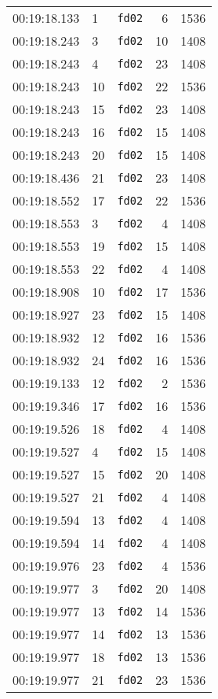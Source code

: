 \documentclass{article}
\begin{document}
\begin{longtable}{lllrr}
00:19:18.133 & 1 & \texttt{fd02} & 6 & 1536 \\
00:19:18.243 & 3 & \texttt{fd02} & 10 & 1408 \\
00:19:18.243 & 4 & \texttt{fd02} & 23 & 1408 \\
00:19:18.243 & 10 & \texttt{fd02} & 22 & 1536 \\
00:19:18.243 & 15 & \texttt{fd02} & 23 & 1408 \\
00:19:18.243 & 16 & \texttt{fd02} & 15 & 1408 \\
00:19:18.243 & 20 & \texttt{fd02} & 15 & 1408 \\
00:19:18.436 & 21 & \texttt{fd02} & 23 & 1408 \\
00:19:18.552 & 17 & \texttt{fd02} & 22 & 1536 \\
00:19:18.553 & 3 & \texttt{fd02} & 4 & 1408 \\
00:19:18.553 & 19 & \texttt{fd02} & 15 & 1408 \\
00:19:18.553 & 22 & \texttt{fd02} & 4 & 1408 \\
00:19:18.908 & 10 & \texttt{fd02} & 17 & 1536 \\
00:19:18.927 & 23 & \texttt{fd02} & 15 & 1408 \\
00:19:18.932 & 12 & \texttt{fd02} & 16 & 1536 \\
00:19:18.932 & 24 & \texttt{fd02} & 16 & 1536 \\
00:19:19.133 & 12 & \texttt{fd02} & 2 & 1536 \\
00:19:19.346 & 17 & \texttt{fd02} & 16 & 1536 \\
00:19:19.526 & 18 & \texttt{fd02} & 4 & 1408 \\
00:19:19.527 & 4 & \texttt{fd02} & 15 & 1408 \\
00:19:19.527 & 15 & \texttt{fd02} & 20 & 1408 \\
00:19:19.527 & 21 & \texttt{fd02} & 4 & 1408 \\
00:19:19.594 & 13 & \texttt{fd02} & 4 & 1408 \\
00:19:19.594 & 14 & \texttt{fd02} & 4 & 1408 \\
00:19:19.976 & 23 & \texttt{fd02} & 4 & 1536 \\
00:19:19.977 & 3 & \texttt{fd02} & 20 & 1408 \\
00:19:19.977 & 13 & \texttt{fd02} & 14 & 1536 \\
00:19:19.977 & 14 & \texttt{fd02} & 13 & 1536 \\
00:19:19.977 & 18 & \texttt{fd02} & 13 & 1536 \\
00:19:19.977 & 21 & \texttt{fd02} & 23 & 1536 \\

\end{longtable}
\end{document}
